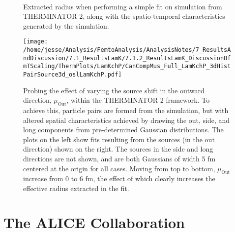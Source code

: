 \documentclass[ALICE,manyauthors]{cernphprep}
\begin{document}
\begin{figure}[h!]
  \centering
   \\
  \caption[Extracted Radius and Pair Sources from THERMINATOR 2]{Extracted radius when performing a simple fit on simulation from THERMINATOR 2, along with the spatio-temporal characteristics generated by the simulation.}
  \label{fig:LamKchP_StdThermSources}
\end{figure}



\begin{figure}[h]
  \centering
  \texttt{[image: /home/jesse/Analysis/FemtoAnalysis/AnalysisNotes/7\_ResultsAndDiscussion/7.1\_ResultsLamK/7.1.2\_ResultsLamK\_DiscussionOfmTScaling/ThermPlots/LamKchP/CanCompMus\_Full\_LamKchP\_3dHistPairSource3d\_oslLamKchP.pdf]}
  \caption[Varying $\mu_{\mathrm{Out}}$ with THERMINATOR 2]
  {
  Probing the effect of varying the source shift in the outward direction, $\mu_{\mathrm{Out}}$, within the THERMINATOR 2 framework.  
  To achieve this, particle pairs are formed from the simulation, but with altered spatial characteristics achieved by drawing the out, side, and long components from pre-determined Gaussian distributions.  
  The plots on the left show fits resulting from the sources (in the out direction) shown on the right.  
  The sources in the side and long directions are not shown, and are both Gaussians of width 5 fm centered at the origin for all cases.  
  Moving from top to bottom, $\mu_{\mathrm{Out}}$ increase from 0 to 6 fm, the effect of which clearly increases the effective radius extracted in the fit.
  }
  \label{fig:LamKchP_ThermSources_VaryMuOut}
\end{figure}

\clearpage



\section{The ALICE Collaboration}
\label{app:collab}
\end{document}
